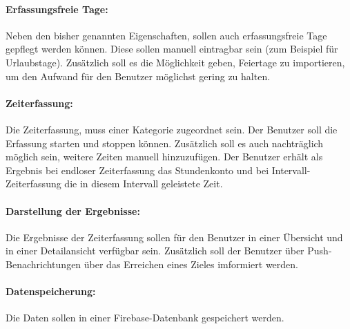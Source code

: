 \paragraph{Erfassungsfreie Tage:}
Neben den bisher genannten Eigenschaften, sollen auch erfassungsfreie Tage gepflegt werden können. Diese sollen
manuell eintragbar sein (zum Beispiel für Urlaubstage). Zusätzlich soll es die Möglichkeit geben,
Feiertage zu importieren, um den Aufwand für den Benutzer möglichst gering zu halten.
\paragraph{Zeiterfassung:}
Die Zeiterfassung, muss einer Kategorie zugeordnet sein. Der Benutzer soll die Erfassung starten und stoppen können.
Zusätzlich soll es auch nachträglich möglich sein, weitere Zeiten manuell hinzuzufügen.
Der Benutzer erhält als Ergebnis bei endloser Zeiterfassung das Stundenkonto und bei Intervall-Zeiterfassung die in diesem Intervall geleistete Zeit.
\paragraph{Darstellung der Ergebnisse:}
Die Ergebnisse der Zeiterfassung sollen für den Benutzer in einer Übersicht und in einer Detailansicht verfügbar sein.
Zusätzlich soll der Benutzer über Push-Benachrichtungen über das Erreichen eines Zieles imformiert werden.
\paragraph{Datenspeicherung:}
Die Daten sollen in einer Firebase-Datenbank gespeichert werden.
